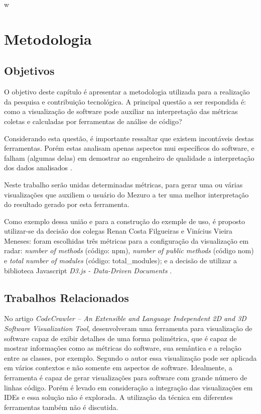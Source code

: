 w\chapter{Metodologia}

\section{Objetivos}

O objetivo deste capítulo é apresentar a metodologia utilizada para a
realização da pesquisa e contribuição tecnológica. A principal questão
a ser respondida é: como a visualização de software pode auxiliar na
interpretação das métricas coletas e calculadas por ferramentas de análise
de código?

Considerando esta questão, é importante ressaltar que existem incontáveis
destas ferramentas. Porém estas analisam apenas aspectos mui específicos
do software, e falham (algumas delas) em demostrar ao engenheiro de
qualidade a interpretação dos dados analisados \cite{deissenboeck2011}.

Neste trabalho serão unidas determinadas métricas, para gerar uma ou várias
visualizações que auxiliem o usuário do Mezuro a ter uma melhor interpretação do
resultado gerado por esta
ferramenta.

Como exemplo dessa união e para a construção do exemple de uso, é proposto
utilizar-se da decisão dos colegas Renan Costa Filgueiras e Vinícius Vieira
Meneses: foram escolhidas três métricas para a configuração da visualização em
radar: \textit{number of methods} (código: npm), \textit{number of public
methods} (código nom) e \textit{total number of modules} (código:
total\_modules); e a decisão de utilizar a biblioteca Javascript \textit{D3.js -
Data-Driven Documents} \cite{filgueiras2014mezuro}.

\section{Trabalhos Relacionados}

No artigo \textit{CodeCrawler – An Extensible and Language Independent 2D and
3D Software Visualization Tool}, 
desenvolveram uma ferramenta para visualização de software capaz de exibir
detalhes de uma forma polimétrica, que é capaz de mostrar informações como as
métricas do software, sua semântica e a relação entre as classes, por exemplo.
Segundo o autor essa visualização pode ser aplicada em vários contextos e não
somente em aspectos de software. Idealmente, a ferramenta é capaz de gerar
visualizações para software com grande número de linhas código. Porém é levado
em consideração a integração das visualizações em IDEs e essa solução não é
explorada. A utilização da técnica em diferentes ferramentas também não é
discutida.

